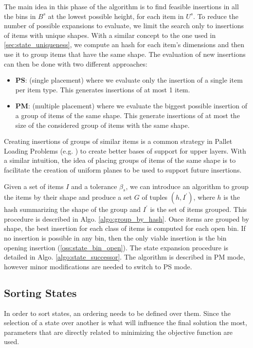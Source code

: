 The main idea in this phase of the algorithm is to find feasible insertions in all the bins in $B^s$ at the lowest possible height, for each item in $U^s$. 
To reduce the number of possible expansions to evaluate, we limit the search only to insertions of items with unique shapes.
With a similar concept to the one used in \cref{sec:state_uniqueness}, we compute an hash for each item's dimensions and then use it to group items that have the same shape.
The evaluation of new insertions can then be done with two different approaches:
\begin{itemize}
    \label{def:placement_modes}%
    \item \textbf{PS}: (single placement) where we evaluate only the insertion of a single item per item type. This generates insertions of at most 1 item.
    \item \textbf{PM}: (multiple placement) where we evaluate the biggest possible insertion of a group of items of the same shape. This generate insertions of at most the size of the considered group of items with the same shape.
\end{itemize}
Creating insertions of groups of similar items is a common strategy in Pallet Loading Problems (e.g. \cite{elhedhli2019three}) to create better bases of support for upper layers.
With a similar intuition, the idea of placing groups of items of the same shape is to facilitate the creation of uniform planes to be used to support future insertions.

Given a set of items $I$ and a tolerance $\beta_s$, we can introduce an algorithm to group the items by their shape and produce a set $G$ of tuples $(h, I^\prime)$, where $h$ is the hash summarizing the shape of the group and $I^\prime$ is the set of items grouped. This procedure is described in Algo. \ref{algo:group_by_hash}.
Once items are grouped by shape, the best insertion for each class of items is computed for each open bin. If no insertion is possible in any bin, then the only viable insertion is the bin opening insertion (\cref{oss:state_bin_open}).
The state expansion procedure is detailed in Algo. \ref{algo:state_successor}. The algorithm is described in PM mode, however minor modifications are needed to switch to PS mode.





\subsection{Sorting States}
\label{ssec:scoring_states}%
In order to sort states, an ordering needs to be defined over them.
Since the selection of a state over another is what will influence the final solution the most, parameters that are directly related to minimizing the objective function are used.

